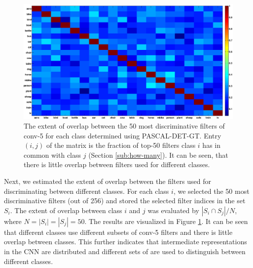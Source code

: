 \begin{figure}[t!]
\centering
\includegraphics[width=1.0\linewidth]{images/ftNet.png}
\caption{The extent of overlap between the 50 most discriminative filters of conv-5 for each class determined using PASCAL-DET-GT.
Entry $(i, j)$ of the matrix is the fraction of top-50 filters class $i$ has in common with class $j$ (Section \ref{sub:how-many}). It can be seen, that there is little overlap between filters used for different classes.}
\label{fig:overlap}
\end{figure}

Next, we estimated the extent of overlap between the filters used for discriminating between different classes.
For each class $i$, we selected the 50 most discriminative filters (out of 256) and stored the selected filter indices in the set $S_i$.
The extent of overlap between class $i$ and $j$ was evaluated by $|S_i \cap S_j| / N$,
where $N = |S_i| = |S_j| = 50$. The results are visualized in Figure \ref{fig:overlap}. It can be seen that different classes use different subsets of conv-5 filters and there is little overlap between classes. This further indicates that intermediate representations in the CNN are distributed and different sets of are used to distinguish between different classes. 


